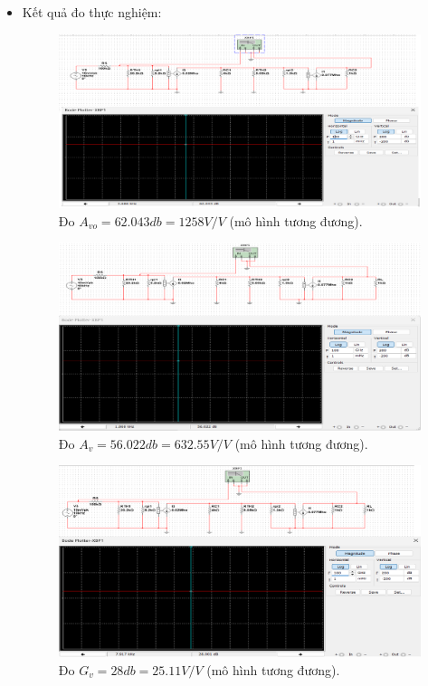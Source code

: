 \begin{itemize}[label=-]
	\item Kết quả đo thực nghiệm:
	\begin{figure}[H]
		\centering
		\includegraphics[width=.8\linewidth]{./my-chapters/my-images/Question10/b_ketqua_0.png}
		\caption{Đo $A_{vo} = 62.043db = 1258 V/V$ (mô hình tương đương).}
	\end{figure}
	\begin{figure}[H]
		\centering
		\includegraphics[width=.8\linewidth]{./my-chapters/my-images/Question10/b_ketqua_1.png}
		\caption{Đo $A_{v} = 56 .022 db =  632.55 V/V$ (mô hình tương đương).}
	\end{figure}
	\begin{figure}[H]
		\centering
		\includegraphics[width=.8\linewidth]{./my-chapters/my-images/Question10/b_ketqua_2.png}
		\caption{Đo $G_{v} = 28 db =  25.11 V/V$ (mô hình tương đương).}
	\end{figure}
	\begin{figure}[H]

\end{figure}
\end{itemize}
